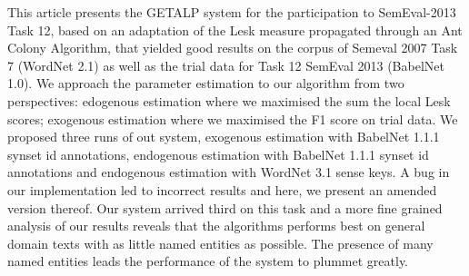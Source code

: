 This article presents the GETALP system for the participation to SemEval-2013 Task 12, based on an adaptation of the Lesk measure propagated through an Ant
 Colony Algorithm, that yielded good results on the corpus of Semeval 2007 Task
 7 (WordNet 2.1) as well as the trial data for Task 12 SemEval 2013 (BabelNet
 1.0). We approach the parameter estimation to our algorithm from two
 perspectives: edogenous estimation where we maximised the sum the local Lesk
 scores; exogenous estimation where we maximised the F1 score on trial data. We
 proposed three runs of out system, exogenous estimation with BabelNet 1.1.1
 synset id annotations, endogenous estimation with BabelNet 1.1.1 synset id
 annotations and endogenous estimation with WordNet 3.1 sense keys. A bug in our
 implementation led to incorrect results and here, we present an amended version
 thereof. Our system arrived third on this task and a more fine grained analysis
 of our results reveals that the algorithms performs best on general domain
 texts with as little named entities as possible. The presence of many named
 entities leads the performance of the system to plummet greatly.

